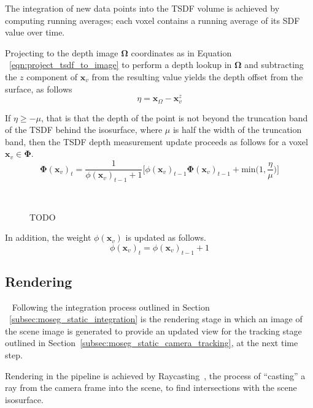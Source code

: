 The integration of new data points into the TSDF volume is achieved by computing 
running averages; each voxel contains a running average of its SDF value over
time.

Projecting to the depth image \(\bm{\Omega}\) coordinates as in Equation
~\ref{eqn:project_tsdf_to_image} to perform a depth lookup in \(\bm{\Omega}\)
and subtracting the \(z\) component of \(\bm{x}_{v}\) from the resulting value
yields the depth offset from the surface, as follows
\begin{equation}
  \label{eqn:integration_offset}
  \eta = \bm{x}_{\Omega} - \bm{x}_{v}^{z}
\end{equation}

If \( \eta \geq -\mu \), that is that the depth of the point is not beyond the
truncation band of the TSDF behind the isosurface, where \( \mu \) is half the 
width of the truncation band, then the TSDF depth measurement update 
proceeds as follows for a voxel \(\bm{x}_{v} \in \bm{\Phi}\).
\begin{equation}
\label{eqn:sdf_update}
\bm{\Phi}{(\bm{x}_{v})}_{t} = \frac{1}{\phi{(\bm{x}_{v})}_{t-1} + 1}
\bigg[\phi{(\bm{x}_{v})}_{t-1}\bm{\bm{\Phi}}{(\bm{x}_{v})}_{t-1} +
\text{min} \bigg( 1, \frac{\eta}{\mu} \bigg)
\bigg]
\end{equation}

\begin{figure}[!htbp]
~\label{fig:truncation_band}
  \caption{TODO}
\end{figure}

In addition, the weight \(\phi(\bm{x}_{v})\) is updated as follows.
\begin{equation}
  \label{eqn:sdf_weight_update}
  \phi{(\bm{x}_{v})}_{t} = \phi{(\bm{x}_{v})}_{t-1} + 1
\end{equation}

\subsection{Rendering}
~\label{subsec:moseg_static_rendering}
Following the integration process outlined in Section
~\ref{subsec:moseg_static_integration} is the rendering stage in which an image
of the scene image is generated to provide an updated view for the tracking
stage outlined in Section~\ref{subsec:moseg_static_camera_tracking}, at the next
time step.

Rendering in the pipeline is achieved by Raycasting~\cite{RAYCAST}, the process of 
``casting'' a ray from the camera frame into the scene, to find intersections with 
the scene isosurface. 

